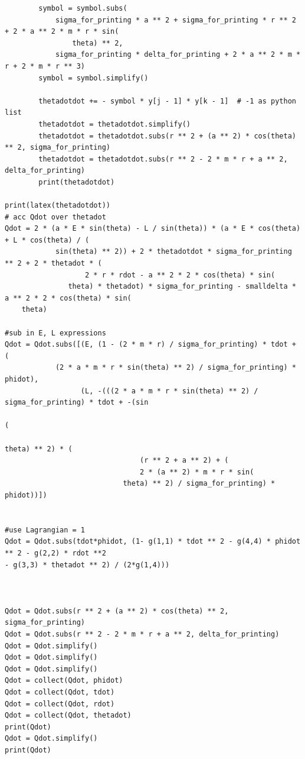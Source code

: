 \documentclass[10pt,a4paper]{report}
\begin{document}
\begin{verbatim}
        symbol = symbol.subs(
            sigma_for_printing * a ** 2 + sigma_for_printing * r ** 2 + 2 * a ** 2 * m * r * sin(
                theta) ** 2,
            sigma_for_printing * delta_for_printing + 2 * a ** 2 * m * r + 2 * m * r ** 3)
        symbol = symbol.simplify()

        thetadotdot += - symbol * y[j - 1] * y[k - 1]  # -1 as python list
        thetadotdot = thetadotdot.simplify()
        thetadotdot = thetadotdot.subs(r ** 2 + (a ** 2) * cos(theta) ** 2, sigma_for_printing)
        thetadotdot = thetadotdot.subs(r ** 2 - 2 * m * r + a ** 2, delta_for_printing)
        print(thetadotdot)

print(latex(thetadotdot))
# acc Qdot over thetadot
Qdot = 2 * (a * E * sin(theta) - L / sin(theta)) * (a * E * cos(theta) + L * cos(theta) / (
            sin(theta) ** 2)) + 2 * thetadotdot * sigma_for_printing ** 2 + 2 * thetadot * (
                   2 * r * rdot - a ** 2 * 2 * cos(theta) * sin(
               theta) * thetadot) * sigma_for_printing - smalldelta * a ** 2 * 2 * cos(theta) * sin(
    theta)

#sub in E, L expressions
Qdot = Qdot.subs([(E, (1 - (2 * m * r) / sigma_for_printing) * tdot + (
            (2 * a * m * r * sin(theta) ** 2) / sigma_for_printing) * phidot),
                  (L, -(((2 * a * m * r * sin(theta) ** 2) / sigma_for_printing) * tdot + -(sin
                                                                                            (
                                                                                                theta) ** 2) * (
                                (r ** 2 + a ** 2) + (
                                2 * (a ** 2) * m * r * sin(
                            theta) ** 2) / sigma_for_printing) * phidot))])


#use Lagrangian = 1
Qdot = Qdot.subs(tdot*phidot, (1- g(1,1) * tdot ** 2 - g(4,4) * phidot ** 2 - g(2,2) * rdot **2 
- g(3,3) * thetadot ** 2) / (2*g(1,4)))



Qdot = Qdot.subs(r ** 2 + (a ** 2) * cos(theta) ** 2, sigma_for_printing)
Qdot = Qdot.subs(r ** 2 - 2 * m * r + a ** 2, delta_for_printing)
Qdot = Qdot.simplify()
Qdot = Qdot.simplify()
Qdot = Qdot.simplify()
Qdot = collect(Qdot, phidot)
Qdot = collect(Qdot, tdot)
Qdot = collect(Qdot, rdot)
Qdot = collect(Qdot, thetadot)
print(Qdot)
Qdot = Qdot.simplify()
print(Qdot)
\end{verbatim}
\end{document}
